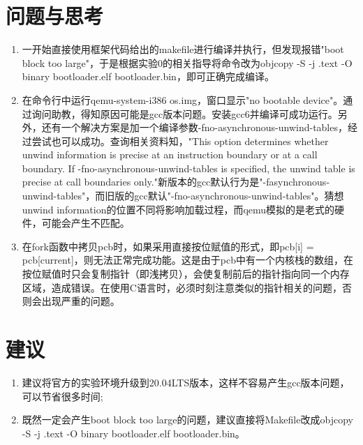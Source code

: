 \documentclass[12pt,a4paper,UTF8]{article}
\begin{document}
\section{问题与思考}
\begin{enumerate}
	\item 一开始直接使用框架代码给出的makefile进行编译并执行，但发现报错"boot block too large"，于是根据实验0的相关指导将命令改为objcopy -S -j .text -O binary bootloader.elf bootloader.bin，即可正确完成编译。
	\item 在命令行中运行qemu-system-i386 os.img，窗口显示"no bootable device"。通过询问助教，得知原因可能是gcc版本问题。安装gcc6并编译可成功运行。另外，还有一个解决方案是加一个编译参数-fno-asynchronous-unwind-tables，经过尝试也可以成功。查询相关资料知，"This option determines whether unwind information is precise at an instruction boundary or at a call boundary. If -fno-asynchronous-unwind-tables is specified, the unwind table is precise at call boundaries only."新版本的gcc默认行为是"-fasynchronous-unwind-tables"，而旧版的gcc默认"-fno-asynchronous-unwind-tables"。猜想unwind information的位置不同将影响加载过程，而qemu模拟的是老式的硬件，可能会产生不匹配。
	\item 在fork函数中拷贝pcb时，如果采用直接按位赋值的形式，即pcb[i] = pcb[current]，则无法正常完成功能。这是由于pcb中有一个内核栈的数组，在按位赋值时只会复制指针（即浅拷贝），会使复制前后的指针指向同一个内存区域，造成错误。在使用C语言时，必须时刻注意类似的指针相关的问题，否则会出现严重的问题。
\end{enumerate}

\section{建议}
\begin{enumerate}
	\item 建议将官方的实验环境升级到20.04LTS版本，这样不容易产生gcc版本问题，可以节省很多时间;
	\item 既然一定会产生boot block too large的问题，建议直接将Makefile改成objcopy -S -j .text -O binary bootloader.elf bootloader.bin。
\end{enumerate}
\end{document}
